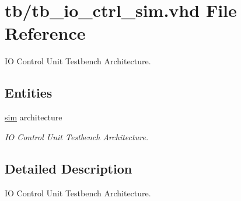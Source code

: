 \hypertarget{tb__io__ctrl__sim_8vhd}{}\section{tb/tb\+\_\+io\+\_\+ctrl\+\_\+sim.vhd File Reference}
\label{tb__io__ctrl__sim_8vhd}


IO Control Unit Testbench Architecture.  


\subsection*{Entities}
\begin{DoxyCompactItemize}
\item 
\hyperlink{classtb__io__ctrl_1_1sim}{sim} architecture
\begin{DoxyCompactList}\small\item\em IO Control Unit Testbench Architecture. \end{DoxyCompactList}\end{DoxyCompactItemize}


\subsection{Detailed Description}
IO Control Unit Testbench Architecture. 

